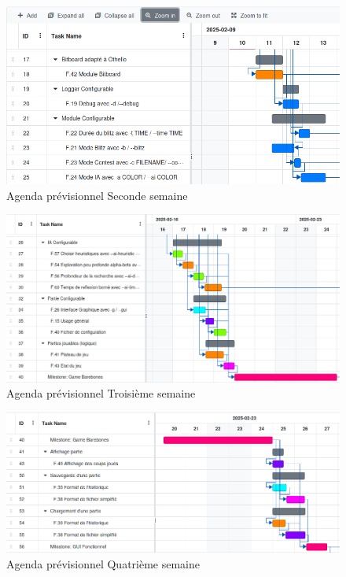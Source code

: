 \documentclass[a4paper,12pt]{article}
\begin{document}
\begin{figure}[H]
  \centering
  \includegraphics[width=18cm]{images/Semaine2.png}
  \caption{Agenda prévisionnel Seconde semaine}
\end{figure}

\begin{figure}[H]
  \centering
  \includegraphics[width=18cm]{images/Semaine3.png}
  \caption{Agenda prévisionnel Troisième semaine}
\end{figure}

\begin{figure}[H]
  \centering
  \includegraphics[width=18cm]{images/Semaine4.png}
  \caption{Agenda prévisionnel Quatrième semaine}
\end{figure}
\end{document}
